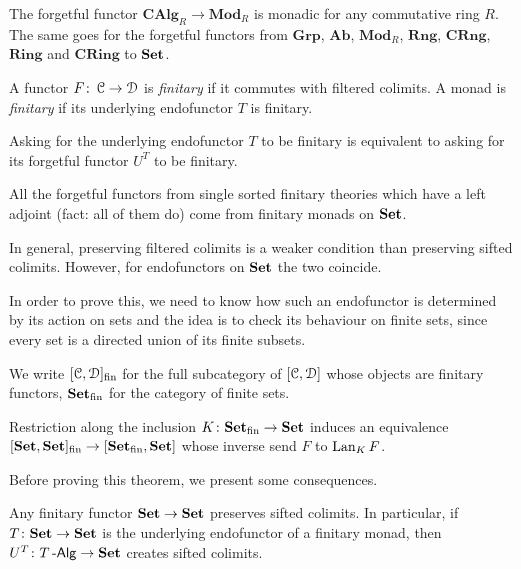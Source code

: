 \documentclass[a4paper,11pt,oneside,openany]{scrbook}
\begin{document}
\begin{exmp}
	The forgetful functor $\mathbf{CAlg}_R\rightarrow\mathbf{Mod}_R$ is monadic for any commutative ring $R$. The same goes for the forgetful functors from $\mathbf{Grp}$, $\mathbf{Ab}$, $\mathbf{Mod}_R$, $\mathbf{Rng}$, $\mathbf{CRng}$, $\mathbf{Ring}$ and $\mathbf{CRing}$ to ${\normalfont\textbf{Set}}$.
\end{exmp}

\begin{defn}
	A functor $F\colon\operatorname{\mathcal{C}}\rightarrow\operatorname{\mathcal{D}}$ is \emph{finitary} if it commutes with filtered colimits. A monad is \emph{finitary} if its underlying endofunctor $T$ is finitary.
\end{defn}

\begin{rmk}
	Asking for the underlying endofunctor $T$ to be finitary is equivalent to asking for its forgetful functor $U^T$ to be finitary.
\end{rmk}

\begin{exmp}
	All the forgetful functors from single sorted finitary theories which have a left adjoint (fact: all of them do) come from finitary monads on ${\normalfont\textbf{Set}}$.
\end{exmp}

In general, preserving filtered colimits is a weaker condition than preserving sifted colimits. However, for endofunctors on ${\normalfont\textbf{Set}}$ the two coincide.

In order to prove this, we need to know how such an endofunctor is determined by its action on sets and the idea is to check its behaviour on finite sets, since every set is a directed union of its finite subsets.

We write $[\operatorname{\mathcal{C}},\operatorname{\mathcal{D}}]_\text{fin}$ for the full subcategory of $[\operatorname{\mathcal{C}},\operatorname{\mathcal{D}}]$ whose objects are finitary functors, ${\normalfont\textbf{Set}}_\text{fin}$ for the category of finite sets.

\begin{thm}
	Restriction along the inclusion $K\colon{\normalfont\textbf{Set}}_\text{fin}\rightarrow{\normalfont\textbf{Set}}$ induces an equivalence $[{\normalfont\textbf{Set}},{\normalfont\textbf{Set}}]_\text{fin}\rightarrow[{\normalfont\textbf{Set}}_\text{fin},{\normalfont\textbf{Set}}]$ whose inverse send $F$ to $\operatorname{Lan}_KF$.
\end{thm}

Before proving this theorem, we present some consequences.

\begin{cor}
	Any finitary functor ${\normalfont\textbf{Set}}\rightarrow{\normalfont\textbf{Set}}$ preserves sifted colimits. In particular, if $T\colon{\normalfont\textbf{Set}}\rightarrow{\normalfont\textbf{Set}}$ is the underlying endofunctor of a finitary monad, then $U^T\colon T\operatorname{-\mathsf{Alg}}\rightarrow{\normalfont\textbf{Set}}$ creates sifted colimits.
\end{cor}
\end{document}
